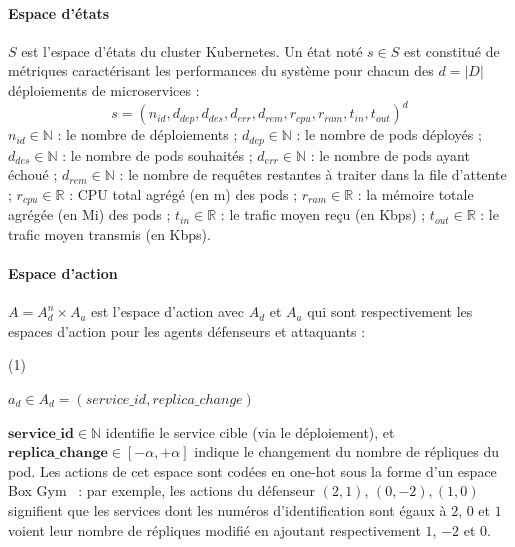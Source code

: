 \noindent \paragraph{\textbf{Espace d'états}} $S$ est l'espace d'états du cluster Kubernetes. Un état noté $s \in S$ est constitué de métriques caractérisant les performances du système pour chacun des $d = |D|$ déploiements de microservices :
$$
s = (n_{id}, d_{dep}, d_{des}, d_{err}, d_{rem}, r_{cpu}, r_{ram}, t_{in}, t_{out})^d
$$
$n_{id} \in \mathbb{N}$ : le nombre de déploiements ; \quad
$d_{dep} \in \mathbb{N}$ : le nombre de pods déployés ; \quad 
$d_{des} \in \mathbb{N}$ : le nombre de pods souhaités ; \quad
$d_{err} \in \mathbb{N}$ : le nombre de pods ayant échoué ; \quad
$d_{rem} \in \mathbb{N}$ : le nombre de requêtes restantes à traiter dans la file d'attente ; \quad
$r_{cpu} \in \mathbb{R}$ : CPU total agrégé (en m) des pods ; \quad
$r_{ram} \in \mathbb{R}$ : la mémoire totale agrégée (en Mi) des pods ; \quad
$t_{in} \in \mathbb{R}$ : le trafic moyen reçu (en Kbps) ; \quad
$t_{out} \in \mathbb{R}$ : le trafic moyen transmis (en Kbps).


\noindent \paragraph{\textbf{Espace d'action}} $A = A_d^n \times A_a$ est l'espace d'action avec $A_d$ et $A_a$ qui sont respectivement les espaces d'action pour les agents défenseurs et attaquants :

\vspace{0.3cm}

\indent\begin{minipage}{0.15\linewidth}
    (1)
\end{minipage}
\begin{minipage}{0.9\linewidth}
    \raggedright
    $\displaystyle a_d \in A_d = (service\_id, replica\_change)$
\end{minipage}

\vspace{0.3cm}

\indent $\mathbf{service\_id} \in \mathbb{N}$ identifie le service cible (via le déploiement), et $\mathbf{replica\_change} \in [-\alpha, +\alpha]$ indique le changement du nombre de répliques du pod. Les actions de cet espace sont codées en one-hot sous la forme d'un espace Box Gym~\cite{openAIGymActionSpaces} : par exemple, les actions du défenseur $(2,1)$, $(0,-2), (1,0)$ signifient que les services dont les numéros d'identification sont égaux à $2$, $0$ et $1$ voient leur nombre de répliques modifié en ajoutant respectivement $1$, $-2$ et $0$.

